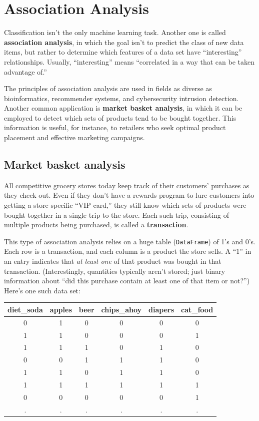 \chapter{Association Analysis}


Classification isn't the only machine learning task. Another one is called
\textbf{association analysis}, in which the goal isn't to predict the class of
new data items, but rather to determine which features of a data set have
``interesting'' relationships. Usually, ``interesting'' means ``correlated in a
way that can be taken advantage of.''

The principles of association analysis are used in fields as diverse as
bioinformatics, recommender systems, and cybersecurity intrusion detection.
Another common application is \textbf{market basket analysis}, in which it can
be employed to detect which sets of products tend to be bought together. This
information is useful, for instance, to retailers who seek optimal product
placement and effective marketing campaigns.

\section{Market basket analysis}

All competitive grocery stores today keep track of their customers' purchases
as they check out. Even if they don't have a rewards program to lure customers
into getting a store-specific ``VIP card,'' they still know which sets of
products were bought together in a single trip to the store. Each such trip,
consisting of multiple products being purchased, is called a
\textbf{transaction}.

This type of association analysis relies on a huge table (\texttt{DataFrame})
of 1's and 0's. Each row is a transaction, and each column is a product the
store sells. A ``1'' in an entry indicates that \textit{at least one} of that
product was bought in that transaction. (Interestingly, quantities typically
aren't stored; just binary information about ``did this purchase contain at
least one of that item or not?'') Here's one such data set:

\begin{center}
\begin{tabular}{|c|c|c|c|c|c|}
\hline
diet\_soda & apples & beer & chips\_ahoy & diapers & cat\_food \\
\hline
0 & 1 & 0 & 0 & 0 & 0 \\
1 & 1 & 0 & 0 & 0 & 1 \\
1 & 1 & 1 & 0 & 1 & 0 \\
0 & 0 & 1 & 1 & 1 & 0 \\
1 & 1 & 0 & 1 & 1 & 0 \\
1 & 1 & 1 & 1 & 1 & 1 \\
0 & 0 & 0 & 0 & 0 & 1 \\
. & . & . & . & . & . \\
\hline
\end{tabular}
\end{center}

